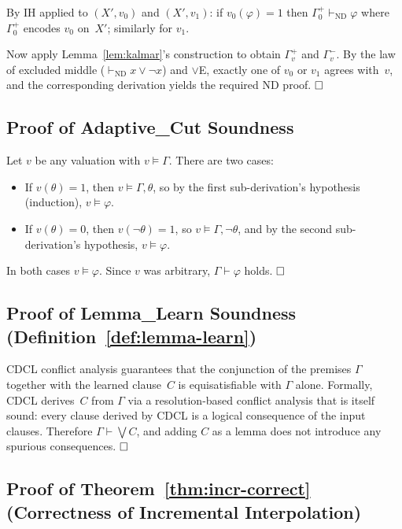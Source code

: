 \documentclass[acmtocl,review,anonymous]{acmart}
\newcommand{\proves}{\vdash}
\begin{document}
By IH applied to $(X', v_0)$ and $(X', v_1)$:
if $v_0(\varphi)=1$ then $\Gamma_0^+ \proves_{\mathrm{ND}} \varphi$ where
$\Gamma_0^+$ encodes $v_0$ on~$X'$; similarly for $v_1$.

Now apply Lemma~\ref{lem:kalmar}'s construction to obtain
$\Gamma_v^+$ and $\Gamma_v^{-}$.  By the law of excluded middle
($\proves_{\mathrm{ND}} x \vee \neg x$) and $\vee$E, exactly one of
$v_0$ or $v_1$ agrees with~$v$, and the corresponding derivation
yields the required ND proof.  $\hfill\square$

\subsection{Proof of Adaptive\_Cut Soundness}

Let $v$ be any valuation with $v \models \Gamma$.
There are two cases:
\begin{itemize}
  \item If $v(\theta) = 1$, then $v \models \Gamma, \theta$, so by the
    first sub-derivation's hypothesis (induction), $v \models \varphi$.
  \item If $v(\theta) = 0$, then $v(\neg\theta) = 1$, so
    $v \models \Gamma, \neg\theta$, and by the second sub-derivation's
    hypothesis, $v \models \varphi$.
\end{itemize}
In both cases $v \models \varphi$.  Since $v$ was arbitrary,
$\Gamma \proves \varphi$ holds.  $\hfill\square$

\subsection{Proof of Lemma\_Learn Soundness
  (Definition~\ref{def:lemma-learn})}

CDCL conflict analysis guarantees that the conjunction of the premises
$\Gamma$ together with the learned clause~$C$ is equisatisfiable with
$\Gamma$ alone.  Formally, CDCL derives~$C$ from $\Gamma$ via a
resolution-based conflict analysis that is itself sound: every clause
derived by CDCL is a logical consequence of the input clauses.
Therefore $\Gamma \proves \bigvee C$, and adding $C$ as a lemma does
not introduce any spurious consequences.  $\hfill\square$

\subsection{Proof of Theorem~\ref{thm:incr-correct}
  (Correctness of Incremental Interpolation)}
\end{document}
